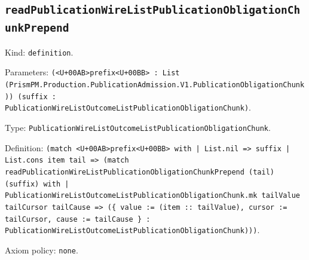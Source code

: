 \documentclass[11pt]{article}
\begin{document}
\subsection*{\texttt{readPublicationWireListPublicationObligationChunkPrepend}}
\noindent Kind: \texttt{definition}.\par
\noindent Parameters: \texttt{(<U+00AB>prefix<U+00BB> : List (PrismPM.Production.PublicationAdmission.V1.PublicationObligationChunk)) (suffix : PublicationWireListOutcomeListPublicationObligationChunk)}.\par
\noindent Type: \texttt{PublicationWireListOutcomeListPublicationObligationChunk}.\par
\noindent Definition: \texttt{(match <U+00AB>prefix<U+00BB> with | List.nil => suffix | List.cons item tail => (match readPublicationWireListPublicationObligationChunkPrepend (tail) (suffix) with | PublicationWireListOutcomeListPublicationObligationChunk.mk tailValue tailCursor tailCause => (\{ value := (item :: tailValue), cursor := tailCursor, cause := tailCause \} : PublicationWireListOutcomeListPublicationObligationChunk)))}.\par
\noindent Axiom policy: \texttt{none}.\par
\end{document}
